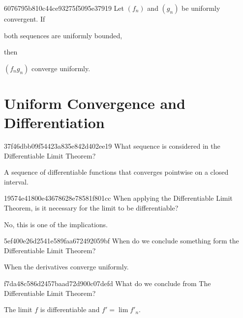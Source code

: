 \begin{note}{6076795b810c44ce93275f5095e37919}
    Let \({ (f_n) }\) and \({ (g_n) }\) be uniformly convergent.
    If \begin{icloze}{2}both sequences are uniformly bounded,\end{icloze} then \begin{icloze}{1}\({ (f_n g_n) }\) converge uniformly.\end{icloze}
\end{note}

\section{Uniform Convergence and Differentiation} %
\begin{note}{37f46dbb09f54423a835e842d402ee19}
    What sequence is considered in the Differentiable Limit Theorem?

    \begin{cloze}{1}
        A sequence of differentiable functions that converges point\-wise on a closed interval.
    \end{cloze}
\end{note}

\begin{note}{19574e41800e43678628e78581f801cc}
    When applying the Differentiable Limit Theorem, is it necessary for the limit to be differentiable?

    \begin{cloze}{1}
        No, this is one of the implications.
    \end{cloze}
\end{note}

\begin{note}{5ef400e26d2541e589faa672492059bf}
    When do we conclude something form the Differentiable Limit Theorem?

    \begin{cloze}{1}
        When the derivatives converge uniformly.
    \end{cloze}
\end{note}

\begin{note}{f7da48c586d2457baad72d900c07defd}
    What do we conclude from The Differentiable Limit Theorem?

    \begin{cloze}{1}
        The limit \({ f }\) is differentiable and \({ f' = \lim f'_n }\).
    \end{cloze}
\end{note}

